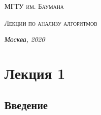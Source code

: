 \documentclass[12pt]{report}
\begin{document}
	\begin{titlepage}
		\centering
		{\scshape\LARGE МГТУ им. Баумана \par}
		\vspace{3cm}
		{\scshape\Large Лекции по анализу алгоритмов\par}
		\vfill
		\large \textit {Москва, 2020} \par
	\end{titlepage}
	\onehalfspacing
	\tableofcontents
	\chapter*{Лекция 1}
	\section*{Введение}
\end{document}
